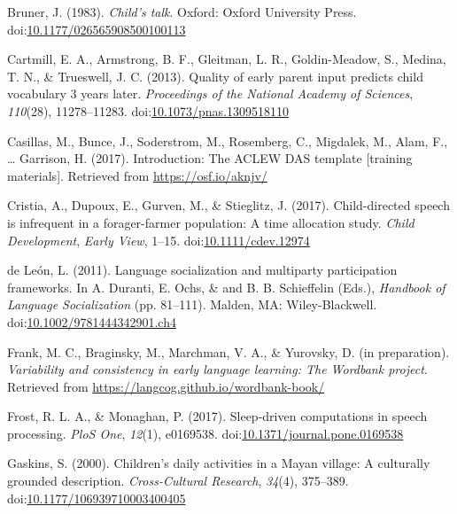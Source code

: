 \documentclass[floatsintext,man]{apa6}
\theoremstyle{definition}
\theoremstyle{definition}
\theoremstyle{definition}
\theoremstyle{remark}
\begin{document}
\hypertarget{ref-bruner1983childs}{}
Bruner, J. (1983). \emph{Child's talk}. Oxford: Oxford University Press.
doi:\href{https://doi.org/10.1177/026565908500100113}{10.1177/026565908500100113}

\hypertarget{ref-cartmill2013quality}{}
Cartmill, E. A., Armstrong, B. F., Gleitman, L. R., Goldin-Meadow, S.,
Medina, T. N., \& Trueswell, J. C. (2013). Quality of early parent input
predicts child vocabulary 3 years later. \emph{Proceedings of the
National Academy of Sciences}, \emph{110}(28), 11278--11283.
doi:\href{https://doi.org/10.1073/pnas.1309518110}{10.1073/pnas.1309518110}

\hypertarget{ref-casillas2017ACLEWDAS}{}
Casillas, M., Bunce, J., Soderstrom, M., Rosemberg, C., Migdalek, M.,
Alam, F., \ldots{} Garrison, H. (2017). Introduction: The ACLEW DAS
template {[}training materials{]}. Retrieved from
\url{https://osf.io/aknjv/}

\hypertarget{ref-cristia2017child}{}
Cristia, A., Dupoux, E., Gurven, M., \& Stieglitz, J. (2017).
Child-directed speech is infrequent in a forager-farmer population: A
time allocation study. \emph{Child Development}, \emph{Early View},
1--15. doi:\href{https://doi.org/10.1111/cdev.12974}{10.1111/cdev.12974}

\hypertarget{ref-deleon2011language}{}
de León, L. (2011). Language socialization and multiparty participation
frameworks. In A. Duranti, E. Ochs, \& and B. B. Schieffelin (Eds.),
\emph{Handbook of Language Socialization} (pp. 81--111). Malden, MA:
Wiley-Blackwell.
doi:\href{https://doi.org/10.1002/9781444342901.ch4}{10.1002/9781444342901.ch4}

\hypertarget{ref-frankIPvariability}{}
Frank, M. C., Braginsky, M., Marchman, V. A., \& Yurovsky, D. (in
preparation). \emph{Variability and consistency in early language
learning: The Wordbank project}. Retrieved from
\url{https://langcog.github.io/wordbank-book/}

\hypertarget{ref-frost2017sleep}{}
Frost, R. L. A., \& Monaghan, P. (2017). Sleep-driven computations in
speech processing. \emph{PloS One}, \emph{12}(1), e0169538.
doi:\href{https://doi.org/10.1371/journal.pone.0169538}{10.1371/journal.pone.0169538}

\hypertarget{ref-gaskins2000childrens}{}
Gaskins, S. (2000). Children's daily activities in a Mayan village: A
culturally grounded description. \emph{Cross-Cultural Research},
\emph{34}(4), 375--389.
doi:\href{https://doi.org/10.1177/106939710003400405}{10.1177/106939710003400405}
\end{document}
